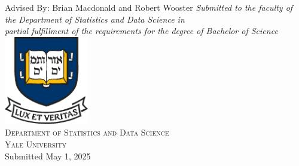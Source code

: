 \thispagestyle{empty}
\begin{titlepage}
    \begin{center}
        \vspace*{0pt}
        \makeatletter    
        \Huge
        \textbf{\@title}\\
        \vspace{1ex}
        \Large
        \vspace{5ex}
        \textbf{\@author}\\
        \vspace{.5ex}
        Advised By: Brian Macdonald and Robert Wooster
        \vfill
        \large\textit{Submitted to the faculty of the Department of Statistics and Data Science in\\partial fulfillment of the requirements for the degree of Bachelor of Science}\\
        \vspace{3ex}
        \includegraphics[width=0.275\textwidth]{graphics/yale-crest.eps}\\
        \vspace{2ex}
        \large
        \textsc{Department of Statistics and Data Science}\\
        \textsc{Yale University}\\
        \vspace{.5ex}
        \normalsize Submitted May 1, 2025
        \makeatother
    \end{center}

    \newpage

    \thispagestyle{empty}
    { }
\end{titlepage}